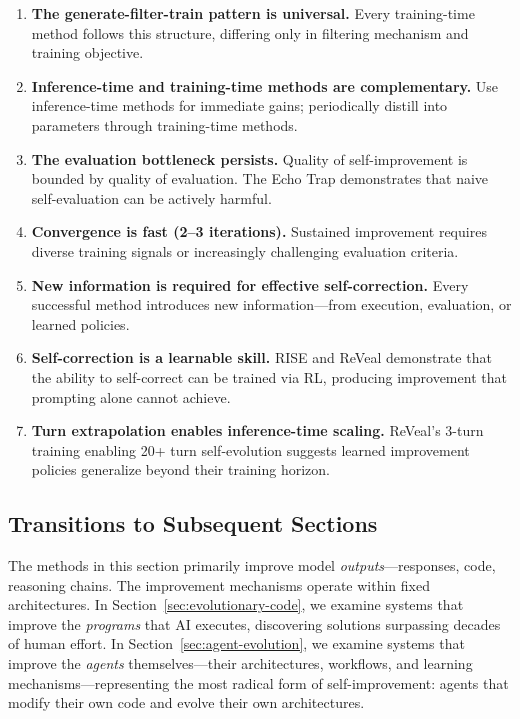 \begin{enumerate}
    \item \textbf{The generate-filter-train pattern is universal.} Every training-time method follows this structure, differing only in filtering mechanism and training objective.
    \item \textbf{Inference-time and training-time methods are complementary.} Use inference-time methods for immediate gains; periodically distill into parameters through training-time methods.
    \item \textbf{The evaluation bottleneck persists.} Quality of self-improvement is bounded by quality of evaluation. The Echo Trap demonstrates that naive self-evaluation can be actively harmful.
    \item \textbf{Convergence is fast (2--3 iterations).} Sustained improvement requires diverse training signals or increasingly challenging evaluation criteria.
    \item \textbf{New information is required for effective self-correction.} Every successful method introduces new information---from execution, evaluation, or learned policies.
    \item \textbf{Self-correction is a learnable skill.} RISE and ReVeal demonstrate that the ability to self-correct can be trained via RL, producing improvement that prompting alone cannot achieve.
    \item \textbf{Turn extrapolation enables inference-time scaling.} ReVeal's 3-turn training enabling 20+ turn self-evolution suggests learned improvement policies generalize beyond their training horizon.
\end{enumerate}

\subsection{Transitions to Subsequent Sections}
\label{sec:transitions}

The methods in this section primarily improve model \emph{outputs}---responses, code, reasoning chains. The improvement mechanisms operate within fixed architectures. In Section~\ref{sec:evolutionary-code}, we examine systems that improve the \emph{programs} that AI executes, discovering solutions surpassing decades of human effort. In Section~\ref{sec:agent-evolution}, we examine systems that improve the \emph{agents} themselves---their architectures, workflows, and learning mechanisms---representing the most radical form of self-improvement: agents that modify their own code and evolve their own architectures.

